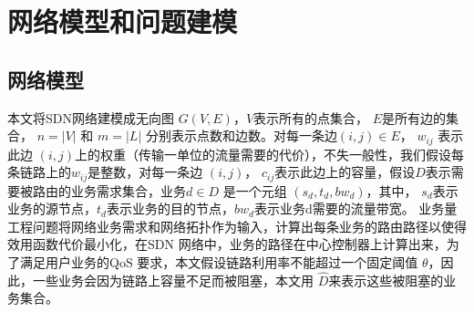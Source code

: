 \section{网络模型和问题建模}
\subsection{网络模型}
本文将SDN网络建模成无向图 $G(V, E)$，$V$表示所有的点集合， $E$是所有边的集合， $n = |V|$ 和 $m = |L|$ 分别表示点数和边数。对每一条边$(i,j)\in E$， $w_{ij}$ 表示此边 $(i,j)$上的权重（传输一单位的流量需要的代价），不失一般性，我们假设每条链路上的$w_{ij}$是整数，对每一条边 $(i,j)$， $c_{ij}$表示此边上的容量，假设$D$表示需要被路由的业务需求集合，业务$d \in D$ 是一个元组 $(s_d, t_d, bw_d)$，其中， $s_d$表示业务的源节点，$t_d$表示业务的目的节点，$bw_d$表示业务d需要的流量带宽。
业务量工程问题将网络业务需求和网络拓扑作为输入，计算出每条业务的路由路径以使得效用函数代价最小化，在SDN 网络中，业务的路径在中心控制器上计算出来，为了满足用户业务的QoS 要求，本文假设链路利用率不能超过一个固定阈值 $\theta$，因此，一些业务会因为链路上容量不足而被阻塞，本文用 $\hat{D}$来表示这些被阻塞的业务集合。
